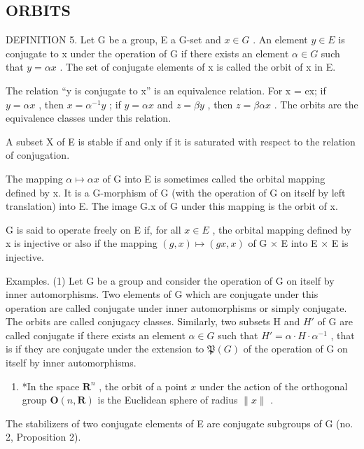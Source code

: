 \subsection{ORBITS}

DEFINITION 5. Let G be a group, E a G-set and \(x \in G\) . An element \(y \in E\) is conjugate to x under the operation of G if there exists an element \(\alpha \in G\) such that \(y = \alpha x\) . The set of conjugate elements of x is called the orbit of x in E.

The relation ``y is conjugate to x'' is an equivalence relation. For x = ex; if \(y = \alpha x\) , then \(x = \alpha^{-1} y\) ; if \(y = \alpha x\) and \(z = \beta y\) , then \(z = \beta \alpha x\) . The orbits are the equivalence classes under this relation.

A subset X of E is stable if and only if it is saturated with respect to the relation of conjugation.

The mapping \(\alpha\mapsto\alpha x\) of G into E is sometimes called the orbital mapping defined by x. It is a G-morphism of G (with the operation of G on itself by left translation) into E. The image G.x of G under this mapping is the orbit of x.

G is said to operate freely on E if, for all \(x \in E\) , the orbital mapping defined by x is injective or also if the mapping \((g, x) \mapsto (gx, x)\) of G × E into E × E is injective.

Examples. (1) Let G be a group and consider the operation of G on itself by inner automorphisms. Two elements of G which are conjugate under this operation are called conjugate under inner automorphisms or simply conjugate. The orbits are called conjugacy classes. Similarly, two subsets H and \(H'\) of G are called conjugate if there exists an element \(\alpha \in G\) such that \(H' = \alpha \cdot H \cdot \alpha^{-1}\) , that is if they are conjugate under the extension to \(\mathfrak{P}(G)\) of the operation of G on itself by inner automorphisms.

\begin{enumerate}
\def\labelenumi{(\arabic{enumi})}
\setcounter{enumi}{1}
\tightlist
\item
  *In the space \(\mathbf{R}^n\) , the orbit of a point \(x\) under the action of the orthogonal group \(\mathbf{O}(n, \mathbf{R})\) is the Euclidean sphere of radius \(\| x \|\) .
\end{enumerate}

The stabilizers of two conjugate elements of E are conjugate subgroups of G (no. 2, Proposition 2).

